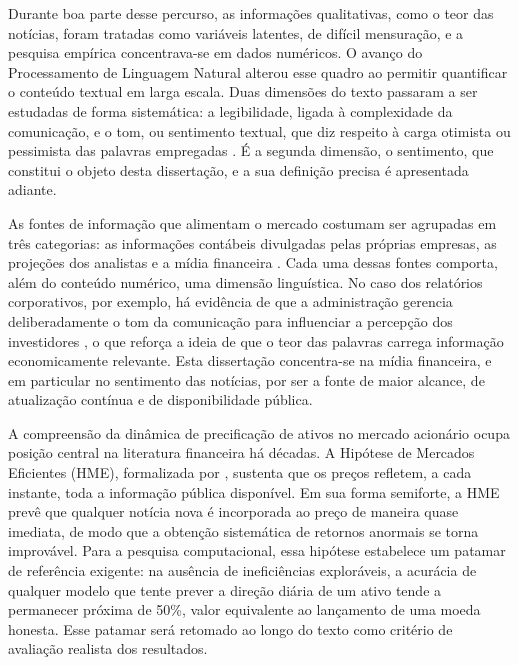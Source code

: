 Durante boa parte desse percurso, as informações qualitativas, como o teor das notícias, foram tratadas como variáveis latentes, de difícil mensuração, e a pesquisa empírica concentrava-se em dados numéricos. O avanço do Processamento de Linguagem Natural alterou esse quadro ao permitir quantificar o conteúdo textual em larga escala. Duas dimensões do texto passaram a ser estudadas de forma sistemática: a legibilidade, ligada à complexidade da comunicação, e o tom, ou sentimento textual, que diz respeito à carga otimista ou pessimista das palavras empregadas \cite{garcia_sentiment_2013}. É a segunda dimensão, o sentimento, que constitui o objeto desta dissertação, e a sua definição precisa é apresentada adiante.

As fontes de informação que alimentam o mercado costumam ser agrupadas em três categorias: as informações contábeis divulgadas pelas próprias empresas, as projeções dos analistas e a mídia financeira \cite{tetlock_more_2008}. Cada uma dessas fontes comporta, além do conteúdo numérico, uma dimensão linguística. No caso dos relatórios corporativos, por exemplo, há evidência de que a administração gerencia deliberadamente o tom da comunicação para influenciar a percepção dos investidores \cite{huang_tone_2014}, o que reforça a ideia de que o teor das palavras carrega informação economicamente relevante. Esta dissertação concentra-se na mídia financeira, e em particular no sentimento das notícias, por ser a fonte de maior alcance, de atualização contínua e de disponibilidade pública.

A compreensão da dinâmica de precificação de ativos no mercado acionário ocupa posição central na literatura financeira há décadas. A Hipótese de Mercados Eficientes (HME), formalizada por , sustenta que os preços refletem, a cada instante, toda a informação pública disponível. Em sua forma semiforte, a HME prevê que qualquer notícia nova é incorporada ao preço de maneira quase imediata, de modo que a obtenção sistemática de retornos anormais se torna improvável. Para a pesquisa computacional, essa hipótese estabelece um patamar de referência exigente: na ausência de ineficiências exploráveis, a acurácia de qualquer modelo que tente prever a direção diária de um ativo tende a permanecer próxima de 50\%, valor equivalente ao lançamento de uma moeda honesta. Esse patamar será retomado ao longo do texto como critério de avaliação realista dos resultados.

